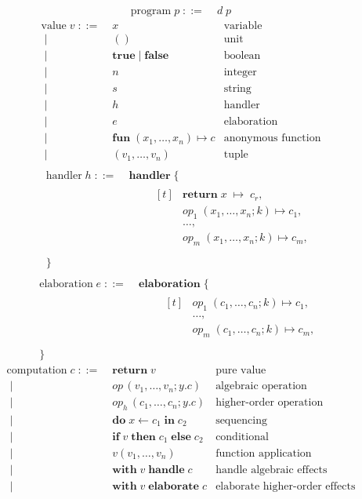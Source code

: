 \documentclass{article}
\newcommand\kw[1]{\mathbf{#1}}
\newcommand\IS{\mathbin{\;::=\;}}
\newcommand\OR{\mathbin{\;|\;}}
\newcommand\true{\kw{true}}
\newcommand\false{\kw{false}}
\newcommand\fun[2]{\kw{fun}\; #1 \mapsto #2}
\newcommand\Handler[1]{\kw{handler}\;\{\\&\qquad#1\\\}}
\newcommand\Elaboration[1]{\kw{elaboration}\;\{\\&\qquad#1\\\}}
\newcommand\return[1]{\kw{return}\; #1}
\newcommand\op[4]{#1\;(#2; #3)\mapsto#4}
\newcommand\opcall[4]{#1\,(#2; #3. #4)}
\newcommand\seq[3]{\kw{do}\;#1 \gets #2\;\kw{in}\;#3}
\newcommand\cond[3]{\kw{if}\;#1\;\kw{then}\;#2\;\kw{else}\;#3}
\newcommand\handle[2]{\kw{with}\;#1\;\kw{handle}\;#2}
\newcommand\elaborate[2]{\kw{with}\;#1\;\kw{elaborate}\;#2}
\begin{document}
\begin{align*}
    \text{program}\;p
        \IS & d \; p
\end{align*}
\begin{align*}
    \text{value}\;v
        \IS & x & \text{variable} \\
        \OR & () & \text{unit} \\
        \OR & \true \OR \false & \text{boolean}\\
        \OR & n & \text{integer} \\
        \OR & s & \text{string} \\
        \OR & h & \text{handler} \\
        \OR & e & \text{elaboration} \\
        \OR & \fun{(x_1, \dots, x_n)}{c} & \text{anonymous function} \\
        \OR & (v_1, \dots, v_n) & \text{tuple} \\
\end{align*}
\begin{align*}
    \text{handler}\;h
        \IS & \Handler{
        \begin{aligned}[t]
            &\return{x} \;\mapsto\; c_r,\\
            &\op{op_1}{x_1, \dots, x_n}{k}{c_1},\\
            &\dots,\\
            &\op{op_m}{x_1, \dots, x_n}{k}{c_m},\;\\
        \end{aligned}
    }\\
\end{align*}
\begin{align*}
    \text{elaboration}\;e
        \IS & \Elaboration{
        \begin{aligned}[t]
            &\op{op_1}{c_1, \dots, c_n}{k}{c_1},\\
            &\dots,\\
            &\op{op_m}{c_1, \dots, c_n}{k}{c_m},\;\\
        \end{aligned}
    }
\end{align*}
\begin{align*}
    \text{computation}\;c
        \IS & \return{v} & \text{pure value}\\
        \OR & \opcall{op}{v_1, \dots, v_n}{y}{c} & \text{algebraic operation}\\
        \OR & \opcall{op_h}{c_1, \dots, c_n}{y}{c} & \text{higher-order operation}\\
        \OR & \seq{x}{c_1}{c_2} & \text{sequencing} \\
        \OR & \cond{v}{c_1}{c_2} & \text{conditional} \\
        \OR & v(v_1,\dots, v_n) & \text{function application}\\
        \OR & \handle{v}{c} & \text{handle algebraic effects}\\
        \OR & \elaborate{v}{c} & \text{elaborate higher-order effects}
\end{align*}
\end{document}
